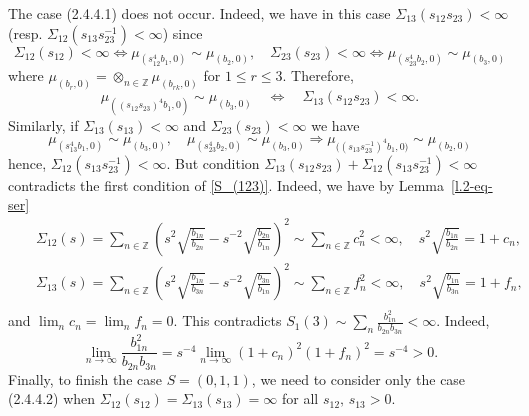 \documentclass[preprint,12pt]{elsarticle}
\numberwithin{equation}{section}
\begin{document}
The case (2.4.4.1) does not occur.
 Indeed, we have  in this case  $\Sigma_{13}(s_{12}s_{23})\!<\!\infty$ (resp. $\Sigma_{12}(s_{13}s_{23}^{-1})\!<\!\infty$) since 
$$
\Sigma_{12}(s_{12})<\infty \Leftrightarrow
\mu_{(s_{12}^4b_1,0)}\sim \mu_{(b_2,0)},\quad
\Sigma_{23}(s_{23})<\infty \Leftrightarrow
\mu_{(s_{23}^4b_2,0)}\sim \mu_{(b_3,0)}
$$
%
where $\mu_{(b_r,0)}\!=\!\otimes_{n\in \mathbb Z}\mu _{(b_{rk},0)}$
%
for $1\!\leq\! r\leq 3$. Therefore,  
\begin{equation*}
 \mu_{((s_{12}s_{23})^4b_1,0)}\sim \mu_{(b_3,0)}\quad
\Leftrightarrow\quad\Sigma_{13}(s_{12}s_{23})\!<\!\infty.
\end{equation*}
Similarly, if $\Sigma_{13}(s_{13})\!<\!\infty$ and $\Sigma_{23}(s_{23})\!<\!\infty$ we have
\begin{equation*}
\mu_{(s_{13}^4b_1,0)}\sim \mu_{(b_3,0)},\quad
\mu_{(s_{23}^4b_2,0)}\sim \mu_{(b_3,0)} \Rightarrow \mu_{\big((s_{13}s_{23}^{-1})^4b_1,0\big)}\sim \mu_{(b_2,0)}
\end{equation*}
hence, $\Sigma_{12}(s_{13}s_{23}^{-1})<\infty$.
%
But condition $\Sigma_{13}(s_{12}s_{23})+\Sigma_{12}(s_{13}s_{23}^{-1})<\infty$ contradicts the first condition of \eqref{S_(123)}. 
%
Indeed, we have by Lemma~\ref{l.2-eq-ser}
\begin{eqnarray*}
&&
\Sigma_{12}(s)=\sum_{n\in \mathbb Z}\left(s^2\sqrt{\frac{b_{1n}}{b_{2n}}}-s^{-2}\sqrt{\frac{b_{2n}}{b_{1n}}}\right)^2
\sim
\sum_{n\in \mathbb Z}c_n^2<\infty,\quad s^2\sqrt{\frac{b_{1n}}{b_{2n}}}=1+c_n,\\
&&
\Sigma_{13}(s)=\sum_{n\in \mathbb Z}\left(s^2\sqrt{\frac{b_{1n}}{b_{3n}}}-s^{-2}\sqrt{\frac{b_{3n}}{b_{1n}}}\right)^2\sim
\sum_{n\in \mathbb Z}f_n^2<\infty,\quad s^2\sqrt{\frac{b_{1n}}{b_{3n}}}=1+f_n,\\
\end{eqnarray*}
and $\lim_nc_n=\lim_nf_n=0$. 
This contradicts
$S_1(3)\sim\sum_n\frac{b_{1n}^2}{b_{2n}b_{3n}}<\infty$. Indeed,
$$
\lim_{n\to\infty}\frac{b_{1n}^2}{b_{2n}b_{3n}}=s^{-4}\lim_{n\to\infty}(1+c_n)^2(1+f_n)^2=s^{-4}>0.
$$
Finally, to finish the case $S=(0,1,1)$, we need to consider only the case (2.4.4.2)
when $\Sigma_{12}(s_{12})\!=\!\Sigma_{13}(s_{13})=\infty$ for all $s_{12},\,s_{13}>0$.
\end{document}
